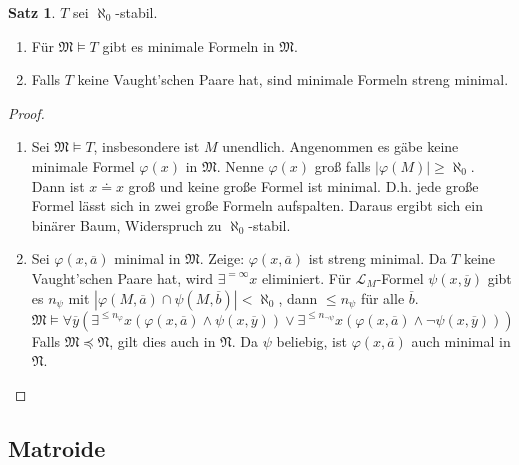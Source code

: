 \documentclass[12pt,parskip=full]{scrartcl}
\newcommand{\abs}[1]{{\left| #1 \right|}}
\theoremstyle{definition}
\newtheorem{theorem}{Satz}[section]
\begin{document}
 	\begin{theorem}
 		$T$ sei $\aleph_0$-stabil.
 		\begin{enumerate}
 			\item Für $\mathfrak{M} \models T$ gibt es minimale Formeln in $\mathfrak{M}$.
 			\item Falls $T$ keine Vaught'schen Paare hat, sind minimale Formeln streng minimal.
 		\end{enumerate}
 	\end{theorem}
 
 	\begin{proof}
 		\begin{enumerate}
 			\item Sei $\mathfrak{M} \models T$, insbesondere ist $M$ unendlich. Angenommen es gäbe keine minimale Formel $\varphi(x)$ in $\mathfrak{M}$. Nenne $\varphi(x)$ groß falls $\abs{\varphi(M)} \geq \aleph_0$. Dann ist $x \doteq x$ groß und keine große Formel ist minimal. D.h. jede große Formel lässt sich in zwei große Formeln aufspalten. Daraus ergibt sich ein binärer Baum, Widerspruch zu $\aleph_0$-stabil.
 			\item Sei $\varphi(x, \overline{a})$ minimal in $\mathfrak{M}$. Zeige: $\varphi(x, \overline{a})$ ist streng minimal. Da $T$ keine Vaught'schen Paare hat, wird $\exists^{=\infty} x$ eliminiert. Für $\mathcal{L}_M$-Formel $\psi(x, \overline{y})$ gibt es $n_\psi$ mit $\abs{\varphi(M, \overline{a}) \cap \psi(M, \overline{b})} < \aleph_0$, dann $\leq n_\psi$ für alle $\overline{b}$.
 			\begin{equation*}
	 			\mathfrak{M} \models \forall \overline{y} ( \exists^{\leq n_\varphi} x ( \varphi(x, \overline{a}) \land \psi(x, \overline{y}) ) \lor \exists^{\leq n_{\lnot \psi}} x ( \varphi(x, \overline{a}) \land \lnot \psi(x, \overline{y}) ) )
 			\end{equation*}
 			Falls $\mathfrak{M} \preccurlyeq \mathfrak{N}$, gilt dies auch in $\mathfrak{N}$. Da $\psi$ beliebig, ist $\varphi(x, \overline{a})$ auch minimal in $\mathfrak{N}$.
 		\end{enumerate}
 	\end{proof}
 
 	\subsection{Matroide}
 	
\end{document}
